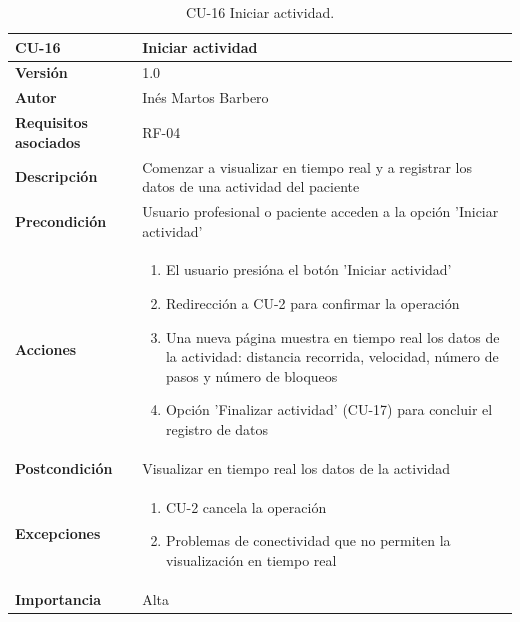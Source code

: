 \begin{table}[p]
	\centering
	\begin{tabularx}{\linewidth}{ p{} p{} }
		\toprule
		\textbf{CU-16}    & \textbf{Iniciar actividad}\\
		\toprule
		\textbf{Versión}              & 1.0    \\
		\textbf{Autor}                & Inés Martos Barbero \\
		\textbf{Requisitos asociados} & RF-04 \\
		\textbf{Descripción}          & Comenzar a visualizar en tiempo real y a registrar los datos de una actividad del paciente \\
		\textbf{Precondición}         & Usuario profesional o paciente acceden a la opción 'Iniciar actividad' \\
		\textbf{Acciones}             &
		\begin{enumerate}
			\def\labelenumi{\arabic{enumi}.}
			\tightlist
			\item El usuario presióna el botón 'Iniciar actividad'
			\item Redirección a CU-2 para confirmar la operación
            \item Una nueva página muestra en tiempo real los datos de la actividad: distancia recorrida, velocidad, número de pasos y número de bloqueos
            \item Opción 'Finalizar actividad' (CU-17) para concluir el registro de datos
		\end{enumerate}\\
		\textbf{Postcondición}        & Visualizar en tiempo real los datos de la actividad \\
		\textbf{Excepciones}          & 
        \begin{enumerate}
			\def\labelenumi{\arabic{enumi}.}
			\tightlist
			\item CU-2 cancela la operación
			\item Problemas de conectividad que no permiten la visualización en tiempo real
		\end{enumerate}\\
		\textbf{Importancia}          & Alta \\
		\bottomrule
	\end{tabularx}
	\caption{CU-16 Iniciar actividad.}
\end{table}

